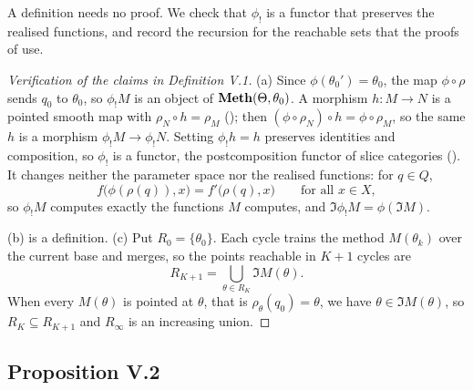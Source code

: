 A definition needs no proof. We check that $\phi_!$ is a functor that preserves the realised functions, and record the
recursion for the reachable sets that the proofs of  use.

\begin{proof}[Verification of the claims in Definition V.1]
(a) Since $\phi(\theta_0')=\theta_0$, the map $\phi\circ\rho$ sends $q_0$ to $\theta_0$, so $\phi_!M$ is an object of
$\mathbf{Meth}(\Theta,\theta_0)$. A morphism $h:M\to N$ is a pointed smooth map with $\rho_N\circ h=\rho_M$
(); then $(\phi\circ\rho_N)\circ h=\phi\circ\rho_M$, so the same $h$ is a morphism
$\phi_!M\to\phi_!N$. Setting $\phi_!h=h$ preserves identities and composition, so $\phi_!$ is a functor, the
postcomposition functor of slice categories (). It changes neither the parameter space nor the realised
functions: for $q\in Q$,
\[f\big(\phi(\rho(q)),x\big)=f'\big(\rho(q),x\big)\qquad\text{for all }x\in X,\]
so $\phi_!M$ computes exactly the functions $M$ computes, and $\Im\phi_!M=\phi(\Im M)$.

(b) is a definition. (c) Put $R_0=\{\theta_0\}$. Each cycle trains the method $M(\theta_k)$ over the current base and
merges, so the points reachable in $K+1$ cycles are
\[R_{K+1}=\bigcup_{\theta\in R_K}\Im M(\theta).\]
When every $M(\theta)$ is pointed at $\theta$, that is $\rho_\theta(q_0)=\theta$, we have $\theta\in\Im M(\theta)$, so
$R_K\subseteq R_{K+1}$ and $R_\infty$ is an increasing union.
\end{proof}

\subsection{Proposition V.2}\label{proof:V.2}

